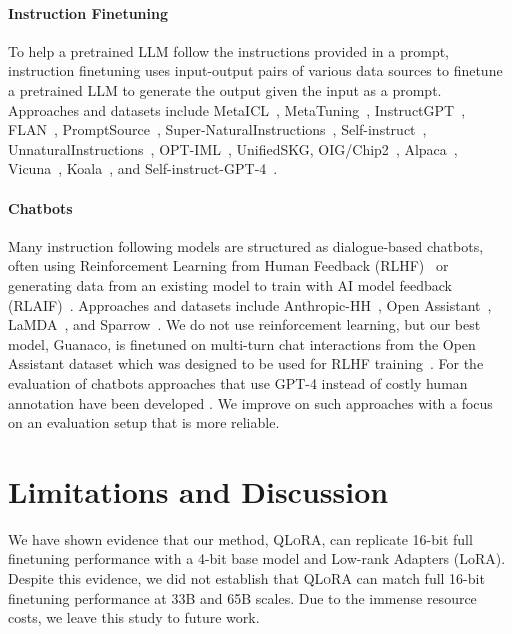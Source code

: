 \paragraph{Instruction Finetuning} To help a pretrained LLM follow the instructions provided in a prompt, instruction finetuning uses input-output pairs of various data sources to finetune a pretrained LLM to generate the output given the input as a prompt. Approaches and datasets include MetaICL~\citep{min2021metaicl}, MetaTuning~\citep{zhong2021adapting}, InstructGPT~\citep{ouyang2022training}, FLAN~\citep{wei2021finetuned,chung2022scaling}, PromptSource~\citep{bach2022promptsource}, Super-NaturalInstructions~\citep{wang2022super,sanh2021multitask}, Self-instruct~\citep{wang2022self}, UnnaturalInstructions~\citep{honovich2022unnatural}, OPT-IML~\citep{iyer2022opt}, UnifiedSKG\citep{xie2022unifiedskg}, OIG/Chip2~\citep{laion2023}, Alpaca~\citep{alpaca}, Vicuna~\citep{vicuna2023}, Koala~\citep{koala_blogpost_2023}, and Self-instruct-GPT-4~\citep{peng2023instruction}.

\paragraph{Chatbots} Many instruction following models are structured as dialogue-based chatbots, often using Reinforcement Learning from Human Feedback (RLHF)~\citep{christiano2017deep} or generating data from an existing model to train with AI model feedback (RLAIF)~\citep{bai2022constitutional}. Approaches and datasets include Anthropic-HH~\citep{askell2021general,bai2022training}, Open Assistant~\citep{kopf2023openassistant}, LaMDA~\citep{thoppilan2022lamda}, and Sparrow~\citep{glaese2022improving}. We do not use reinforcement learning, but our best model, Guanaco, is finetuned on multi-turn chat interactions from the Open Assistant dataset which was designed to be used for RLHF training~\citep{kopf2023openassistant}. For the evaluation of chatbots approaches that use GPT-4 instead of costly human annotation have been developed \citep{vicuna2023,peng2023instruction}. We improve on such approaches with a focus on an evaluation setup that is more reliable.

\section{Limitations and Discussion}

We have shown evidence that our method, \textsc{QLoRA}, can replicate 16-bit full finetuning performance with a 4-bit base model and Low-rank Adapters (LoRA). Despite this evidence, we did not establish that \textsc{QLoRA} can match full 16-bit finetuning performance at 33B and 65B scales. Due to the immense resource costs, we leave this study to future work. 

